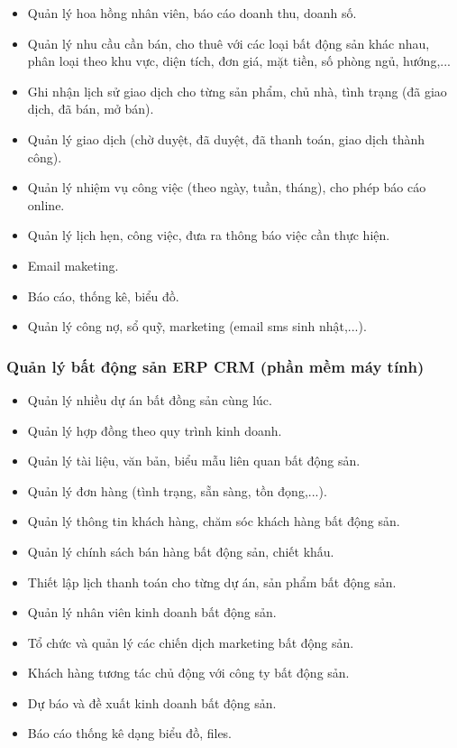 \documentclass[12pt,a4paper]{article}
\begin{document}
\begin{itemize}
        \item Quản lý hoa hồng nhân viên, báo cáo doanh thu, doanh số.
        \item Quản lý nhu cầu cần bán, cho thuê với các loại bất động sản khác nhau, phân loại theo khu vực, diện tích, đơn giá, mặt tiền, số phòng ngủ, hướng,...
        \item Ghi nhận lịch sử giao dịch cho từng sản phẩm, chủ nhà, tình trạng (đã giao dịch, đã bán, mở bán).
        \item Quản lý giao dịch (chờ duyệt, đã duyệt, đã thanh toán, giao dịch thành công).
        \item Quản lý nhiệm vụ công việc (theo ngày, tuần, tháng), cho phép báo cáo online.
        \item Quản lý lịch hẹn, công việc, đưa ra thông báo việc cần thực hiện.
        \item Email maketing.
        \item Báo cáo, thống kê, biểu đồ.
        \item Quản lý công nợ, sổ quỹ, marketing (email sms sinh nhật,...).
    \end{itemize}
    \subsubsection*{Quản lý bất động sản ERP CRM (phần mềm máy tính)}
    \begin{itemize}
        \item Quản lý nhiều dự án bất đồng sản cùng lúc.
        \item Quản lý hợp đồng theo quy trình kinh doanh.
        \item Quản lý tài liệu, văn bản, biểu mẫu liên quan bất động sản.
        \item Quản lý đơn hàng (tình trạng, sẵn sàng, tồn đọng,...).
        \item Quản lý thông tin khách hàng, chăm sóc khách hàng bất động sản.
        \item Quản lý chính sách bán hàng bất động sản, chiết khấu.
        \item Thiết lập lịch thanh toán cho từng dự án, sản phẩm bất động sản.
        \item Quản lý nhân viên kinh doanh bất động sản.
        \item Tổ chức và quản lý các chiến dịch marketing bất động sản.
        \item Khách hàng tương tác chủ động với công ty bất động sản.
        \item Dự báo và đề xuất kinh doanh bất động sản.
        \item Báo cáo thống kê dạng biểu đồ, files.
    \end{itemize}
\end{document}
